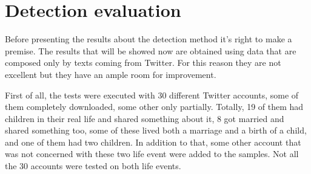 \section{Detection evaluation}
\label{sec:detectioneva}
\noindent
\renewcommand\arraystretch{1.5}
\setlength\tabcolsep{0pt}
\begin{table}
\centering
{}
\quad
{}
\caption{Confusion matrices of boolean tests}
\end{table}
Before presenting the results about the detection method it's right to make a premise. The results that will be showed now are obtained using data that are composed only by texts coming from Twitter. For this reason they are not excellent but they have an ample room for improvement.

First of all, the tests were executed with 30 different Twitter accounts, some of them completely downloaded, some other only partially. Totally, 19 of them had children in their real life and shared something about it, 8 got married and shared something too, some of these lived both a marriage and a birth of a child, and one of them had two children. In addition to that, some other account that was not concerned with these two life event were added to the samples. Not all the 30 accounts were tested on both life events.

